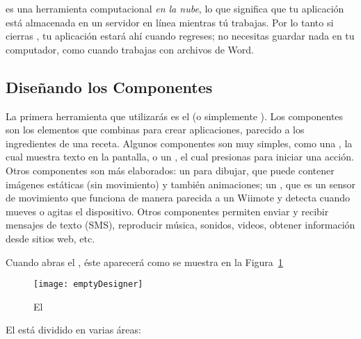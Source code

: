 \AppInventor es una herramienta computacional \emph{en la nube}, lo que significa que tu aplicación está almacenada en un servidor en línea mientras tú trabajas. Por lo tanto si cierras \AppInventor, tu aplicación estará ahí cuando regreses; no necesitas guardar nada en tu computador, como cuando trabajas con archivos de Word.

\subsection*{Diseñando los Componentes}

La primera herramienta que utilizarás es el \componentDesigner (o simplemente \designer). Los componentes son los elementos que combinas para crear aplicaciones, parecido a los ingredientes de una receta. Algunos componentes son muy simples, como una , la cual muestra texto en la pantalla, o un , el cual presionas para iniciar una acción. Otros componentes son más elaborados: un  para dibujar, que puede contener imágenes estáticas (sin movimiento) y también animaciones; un , que es un sensor de movimiento que funciona de manera parecida a un Wiimote y detecta cuando mueves o agitas el dispositivo. Otros componentes permiten enviar y recibir mensajes de texto (SMS), reproducir música, sonidos, videos, obtener información desde sitios web, etc.

Cuando abras el \designer, éste aparecerá como se muestra en la Figura~\ref{fig:emptyDesigner}

\begin{figure}[H]
  \centering
  \texttt{[image: emptyDesigner]}
  \caption{El \componentDesigner}
  \label{fig:emptyDesigner}
\end{figure}

El \designer está dividido en varias áreas:

